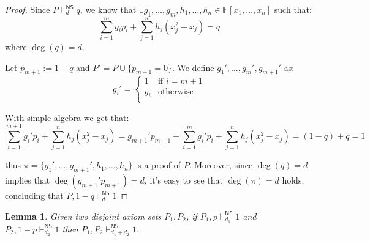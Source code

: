 \documentclass[12pt]{article}
\newtheorem{lemma}{Lemma}
\theoremstyle{definition}
\newcommand{\F}{\mathbb{F}}
\newcommand{\NS}{\mathsf{NS}}
\begin{document}
    \begin{proof}
        
        Since $P \vdash^\NS_d q$, we know that $\exists g_1, \ldots, g_m, h_1, \ldots, h_n \in \F[x_1, \ldots, x_n]$ such that:
        \[\sum_{i = 1}^m g_i p_i + \sum_{j = 1}^n h_j (x_j^2-x_j) = q\]
        where $\deg(q) = d$.

        Let $p_{m+1} := 1-q$ and $P' = P \cup \{p_{m+1} = 0\}$. We define $g_1', \ldots, g_m', g_{m+1}'$ as:
        \[g_i' = \left \{ \begin{array}{ll}
            1 & \text{if } i = m+1 \\
            g_i & \text{otherwise}  \\
        \end{array}\right .\]
        
        With simple algebra we get that:
        \[\sum_{i = 1}^{m+1} g_i' p_i + \sum_{j = 1}^n h_j (x_j^2-x_j) = g_{m+1}'p_{m+1} + \sum_{i = 1}^{m} g_i' p_i + \sum_{j = 1}^n h_j (x_j^2-x_j) = (1-q) + q = 1\]
        
        thus $\pi = \{g_1', \ldots, g_{m+1}', h_1, \ldots, h_n\}$ is a proof of $P$. Moreover, since $\deg(q) = d$ implies that $\deg(g_{m+1}'p_{m+1}) = d$, it's easy to see that $\deg(\pi) = d$ holds, concluding that $P, 1-q \vdash_d^\NS 1$

    \end{proof}

    \begin{lemma}
        \label{union_ref}
        Given two disjoint axiom sets $P_1, P_2$, if $P_1, p \vdash_{d_1}^\NS 1$ and $P_2, 1-p \vdash_{d_2}^\NS 1$ then $P_1, P_2 \vdash_{d_1+ d_2}^\NS  1$.
    \end{lemma}
\end{document}

